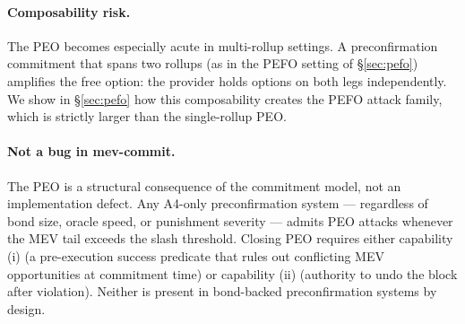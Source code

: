 \paragraph{Composability risk.}
The PEO becomes especially acute in multi-rollup settings. A preconfirmation
commitment that spans two rollups (as in the PEFO setting of \S\ref{sec:pefo})
amplifies the free option: the provider holds options on both legs
independently. We show in \S\ref{sec:pefo} how this composability
creates the PEFO attack family, which is strictly larger than the
single-rollup PEO.

\paragraph{Not a bug in mev-commit.}
The PEO is a structural consequence of the commitment model, not an
implementation defect. Any A4-only preconfirmation system --- regardless
of bond size, oracle speed, or punishment severity --- admits PEO attacks
whenever the MEV tail exceeds the slash threshold. Closing PEO requires
either capability (i) (a pre-execution success predicate that rules out
conflicting MEV opportunities at commitment time) or capability (ii)
(authority to undo the block after violation). Neither is present in
bond-backed preconfirmation systems by design.
